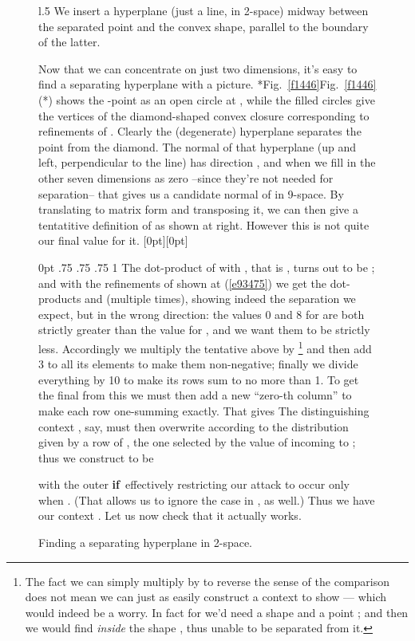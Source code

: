 \documentclass[runningheads]{llncs}
\newcommand\Eqn[1] {(\ref{#1})}
\newcommand\If {\textbf{if}}
\newenvironment{Figure}[2][t]{\begin{figure}[#1]\def\Label{#2}\small}{\label{\Label}\end{figure}}
\newcommand\Fig[2][*] {{\def\z{#1}\if*\z Fig.~\ref{#2}\else Fig.~\ref{#2}(#1)\fi}}
\begin{document}
\begin{Figure}[ht!]{f1228}
\begin{wrapfigure}{l}{.5\textwidth}
\small We insert a hyperplane (just a line, in 2-space) midway between the separated point and the convex shape, parallel to the boundary of the latter.
\caption{Finding a separating hyperplane  in 2-space.}\label{f1446}
\end{wrapfigure}

Now that we can concentrate on just two dimensions, it's easy to find a separating hyperplane with a picture. \Fig{f1446} shows the -point as an open circle at , while the filled circles give the vertices of the diamond-shaped convex closure corresponding to refinements of . Clearly the (degenerate) hyperplane  separates the point from the diamond. The normal of that hyperplane (up and left, perpendicular to the line) has direction , and when we fill in the other seven dimensions as zero --since they're not needed for separation-- that gives us a candidate normal of  in 9-space. By translating  to matrix form and transposing it, we can then give a tentatitive definition of  as shown at right. However this is not quite our final value for it. 
\hspace{\fill}
\raisebox{-1.8em}[0pt][0pt]{

}

  0pt .75\linewidth 0pt .75\linewidth 0pt .75\linewidth 0pt 1\linewidth
The dot-product of  with , that is , turns out to be ; and with the refinements of  shown at \Eqn{e93475} we get the dot-products  and  (multiple times), showing indeed the separation we expect, but in the wrong direction: the values 0 and 8 for  are both strictly greater than the value  for , and we want them to be strictly less. Accordingly we multiply the tentative  above by 
\footnote{The fact we can simply multiply by  to reverse the sense of the comparison does not mean we can just as easily construct a context to show  --- which would indeed be a worry. In fact for  we'd need a shape  and a point ; and then we would find  \emph{inside} the shape , thus unable to be separated from it.}
and then add 3 to all its elements to make them non-negative; finally we divide everything by 10 to make its rows sum to no more than 1. To get the final  from this we must then add a new ``zero-th column'' to make each row one-summing exactly. That gives
\vspace{1em}
The distinguishing context , say, must then overwrite  according to the distribution given by a row of , the one selected by the value  of  incoming to ;
thus we construct  to be

with the outer \If\ effectively restricting our attack to occur only when . (That allows us to ignore the  case in , as well.) Thus we have our context . Let us now check that it actually works.


\end{Figure}
\end{document}
